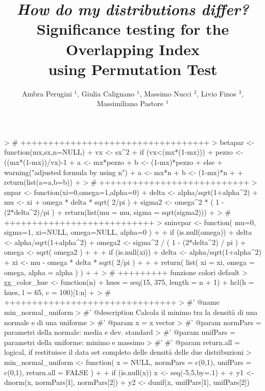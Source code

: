 \documentclass[twocolumn]{article}
\begin{document}


\title{\textbf{\textit{How do my distributions differ?} \\ Significance testing for the Overlapping Index \\ using Permutation Test}}
\author{Ambra Perugini $^1$, Giulia Calignano $^1$, Massimo Nucci $^2$, Livio Finos $^3$, Massimiliano Pastore $^1$}

\maketitle

\begin{Schunk}
\begin{Sinput}
> # ++++++++++++++++++++++++++++++++++
> betapar <- function(mx,sx,n=NULL) {
+   vx <- sx^2
+   if (vx<(mx*(1-mx))) {
+     pezzo <- ((mx*(1-mx))/vx)-1
+     a <- mx*pezzo
+     b <- (1-mx)*pezzo
+   } else {
+     warning("adjusted formula by using n")
+     a <- mx*n
+     b <- (1-mx)*n
+   }
+   return(list(a=a,b=b))
+ }
> # +++++++++++++++++++++++++++
> snpar <- function(xi=0,omega=1,alpha=0) {
+   delta <- alpha/sqrt(1+alpha^2)
+   mu <- xi + omega * delta * sqrt( 2/pi )
+   sigma2 <- omega^2 * ( 1 - (2*delta^2)/pi )
+   return(list(mu = mu, sigma = sqrt(sigma2)))
+ }
> # +++++++++++++++++++++++++++
> sninvpar <- function( mu=0, sigma=1, xi=NULL, omega=NULL, alpha=0 ) {
+   
+   if (is.null(omega)) {
+     delta <- alpha/sqrt(1+alpha^2)
+     omega2 <- sigma^2 / ( 1 - (2*delta^2) / pi )
+     omega <- sqrt( omega2 )
+   }
+   
+   if (is.null(xi)) {
+     delta <- alpha/sqrt(1+alpha^2)
+     xi <- mu - omega * delta * sqrt( 2/pi )
+   }
+   
+   return( list( xi = xi, omega = omega, alpha = alpha ) )
+   
+ }
> # +++++++++ funzione colori default
> gg_color_hue <- function(n) {
+   hues = seq(15, 375, length = n + 1)
+   hcl(h = hues, l = 65, c = 100)[1:n]
+ }
> # +++++++++++++++++++++++++++++++
> #' @name min_normal_uniform
> #' @description Calcola il minimo tra la densità di una normale e di una uniforme
> #' @param x = x vector
> #' @param normPars = parametri della normale: media e dev. standard
> #' @param unifPars = parametri della uniforme: minimo e massimo
> #' #' @param return.all = logical, if  restituisce il data set completo delle densità delle due distribuzioni
> min_normal_uniform <- function( x = NULL, normPars = c(0,1), unifPars = c(0,1), return.all = FALSE ) {
+   
+   if (is.null(x)) x <- seq(-5,5,by=.1)
+   
+   y1 <- dnorm(x, normPars[1], normPars[2])
+   y2 <- dunif(x, unifPars[1], unifPars[2])
}
\end{Sinput}
\end{Schunk}
\end{document}
